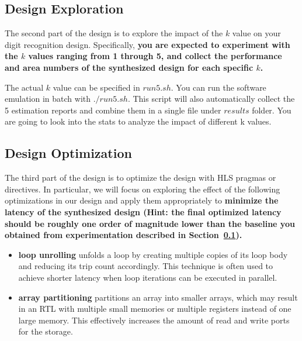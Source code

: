 \documentclass[paper=letter, fontsize=10pt]{scrartcl} %
\numberwithin{equation}{section} %
\numberwithin{figure}{section} %
\numberwithin{table}{section} %
\begin{document}
\subsection{Design Exploration}
\label{design-expl}
The second part of the design is to explore the impact of the $k$ value on your digit recognition design. Specifically, \textbf{you are expected to experiment with the $k$ values ranging from 1 through 5, and collect the performance and area numbers of the synthesized design for each specific $k$.} 

    The actual $k$ value can be specified in $run5.sh$. You can run the software emulation in batch with $./run5.sh$. This script will also automatically collect the 5 estimation reports and combine them in a single file under $results$ folder. You are going to look into the stats to analyze the impact of different k values.
  

\subsection{Design Optimization}
\label{design-opt}
The third part of the design is to optimize the design with HLS pragmas or directives. In particular, we will focus on exploring the effect of the following optimizations in our design and apply them appropriately to \textbf{minimize the latency of the synthesized design (Hint: the final optimized latency should be roughly one order of magnitude lower than the baseline you obtained from experimentation described in Section~\ref{design-expl}).} 
\begin{itemize}
\item \textbf{loop unrolling} unfolds a loop by creating multiple copies of its loop body and reducing its trip count accordingly. This technique is often used to achieve shorter latency when loop iterations can be executed in parallel. 
\item \textbf{array partitioning} partitions an array into smaller arrays, which may result in an RTL with multiple small memories or multiple registers instead of one large memory. This effectively increases the amount of read and write ports for the storage.
\end{itemize}
\end{document}
